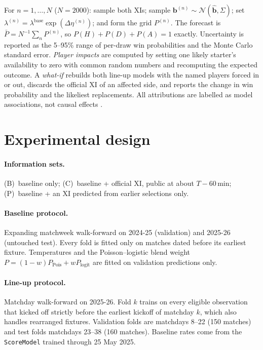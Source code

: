 \documentclass[11pt,a4paper]{article}
\newcommand{\code}[1]{\texttt{\small #1}}
\begin{document}
For $n=1,\dots,N$ ($N=2000$): sample both XIs; sample
$\bm b^{(n)}\sim\mathcal N(\hat{\bm b},\Sigma)$; set
$\lambda^{(n)}=\lambda^{\text{base}}\exp(\Delta\eta^{(n)})$; and form the grid
$P^{(n)}$. The forecast is $\bar P=N^{-1}\sum_nP^{(n)}$, so
$P(H)+P(D)+P(A)=1$ exactly. Uncertainty is reported as the 5--95\% range of
per-draw win probabilities and the Monte Carlo standard error. \emph{Player
impacts} are computed by setting one likely starter's availability to zero
with common random numbers and recomputing the expected outcome. A
\emph{what-if} rebuilds both line-up models with the named players forced in or
out, discards the official XI of an affected side, and reports the change in
win probability and the likeliest replacements. All attributions are labelled
as model associations, not causal effects \citep{hernan2020}.

\section{Experimental design}\label{sec:design}

\paragraph{Information sets.}
(B)~baseline only; (C)~baseline + official XI, public at about $T-60$\,min;
(P)~baseline + an XI predicted from earlier selections only.

\paragraph{Baseline protocol.}
Expanding matchweek walk-forward on 2024-25 (validation) and 2025-26
(untouched test). Every fold is fitted only on matches dated before its
earliest fixture. Temperatures and the Poisson--logistic blend weight
$P=(1-w)P_{\text{Pois}}+wP_{\text{logit}}$ are fitted on validation predictions
only.

\paragraph{Line-up protocol.}
Matchday walk-forward on 2025-26. Fold $k$ trains on every eligible observation
that kicked off strictly before the earliest kickoff of matchday $k$, which
also handles rearranged fixtures. Validation folds are matchdays 8--22 (150
matches) and test folds matchdays 23--38 (160 matches). Baseline rates come
from the \code{ScoreModel} trained through 25 May 2025.
\end{document}
